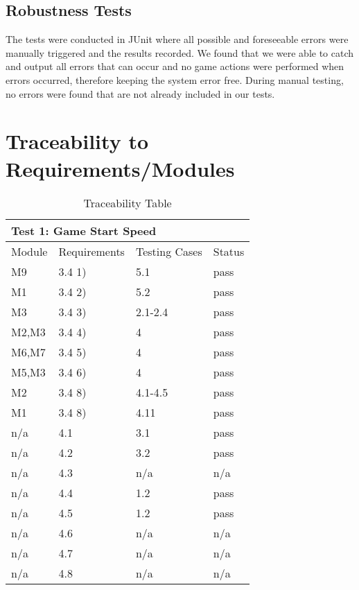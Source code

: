 \documentclass[11pt]{article}
\begin{document}
	\subsection{Robustness Tests}
	The tests were conducted in JUnit where all possible and foreseeable errors were manually triggered and the results recorded. We found that we were able to catch and output all errors that can occur and no game actions were performed when errors occurred, therefore keeping the system error free. During manual testing, no errors were found that are not already included in our tests. 
	\section{Traceability to Requirements/Modules}
	\begin{table}[H]
	\caption{Traceability Table}
	\begin{tabular}{|p{3cm}|p{3cm}|p{3cm}|p{3cm}|}
	\hline
	\multicolumn{4}{|l|}{Test 1: Game Start Speed}\\
	\hline
	Module & Requirements & Testing Cases & Status\\
	\hline
	M9 & 3.4 1) & 5.1 & pass\\
	\hline
	M1 & 3.4 2) & 5.2 & pass\\
	\hline
	M3 & 3.4 3) & 2.1-2.4 & pass\\
	\hline
	M2,M3 & 3.4 4) & 4 & pass\\
	\hline
	M6,M7 & 3.4 5) & 4 & pass\\
	\hline
	M5,M3 & 3.4 6) & 4 & pass\\
	\hline
	M2 & 3.4 8) & 4.1-4.5 & pass\\
	\hline
	M1 & 3.4 8) & 4.11 & pass\\
	\hline
	n/a & 4.1 & 3.1 & pass\\
	\hline
	n/a & 4.2 & 3.2 & pass\\
	\hline
	n/a & 4.3 & n/a & n/a\\
	\hline
	n/a & 4.4 & 1.2 & pass\\
	\hline
	n/a & 4.5 & 1.2 & pass\\
	\hline
	n/a & 4.6 & n/a & n/a\\
	\hline
	n/a & 4.7 & n/a & n/a\\
	\hline
	n/a & 4.8 & n/a & n/a\\
	\hline

	\end{tabular}
	\end{table}

		
\end{document}
